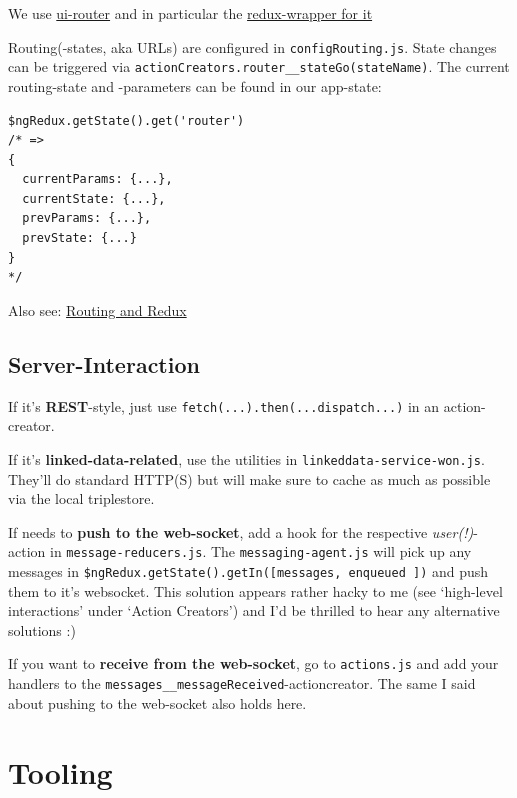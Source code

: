 We use
\href{https://github.com/angular-ui/ui-router/wiki/Quick-Reference}{ui-router}
and in particular the
\href{https://github.com/neilff/redux-ui-router}{redux-wrapper for it}

Routing(-states, aka URLs) are configured in \texttt{configRouting.js}. %
State changes can be triggered via
\texttt{actionCreators.router\_\_stateGo(stateName)}. %
The current
routing-state and -parameters can be found in our app-state:

\begin{verbatim}
$ngRedux.getState().get('router')
/* =>
{
  currentParams: {...},
  currentState: {...},
  prevParams: {...},
  prevState: {...}
}
*/
\end{verbatim}

Also see:
\href{https://github.com/researchstudio-sat/webofneeds/issues/344}{Routing
and Redux} %

\subsection{Server-Interaction}\label{server-interaction}

If it's \textbf{REST}-style, just use
\texttt{fetch(...).then(...dispatch...)} in an action-creator.

If it's \textbf{linked-data-related}, use the utilities in
\texttt{linkeddata-service-won.js}. They'll do standard HTTP(S) but will
make sure to cache as much as possible via the local triplestore.

If needs to \textbf{push to the web-socket}, add a hook for the
respective \emph{user(!)}-action in \texttt{message-reducers.js}. The
\texttt{messaging-agent.js} will pick up any messages in
\texttt{\$ngRedux.getState().getIn({[\textquotesingle{}messages\textquotesingle{},
\textquotesingle{}enqueued\textquotesingle{}  ]})}
and push them to it's websocket. This solution appears rather hacky to
me (see `high-level interactions' under `Action Creators') and I'd be
thrilled to hear any alternative solutions :)

If you want to \textbf{receive from the web-socket}, go to
\texttt{actions.js} and add your handlers to the
\texttt{messages\_\_messageReceived}-actioncreator. The same I said
about pushing to the web-socket also holds here.
\section{Tooling}\label{tooling}

